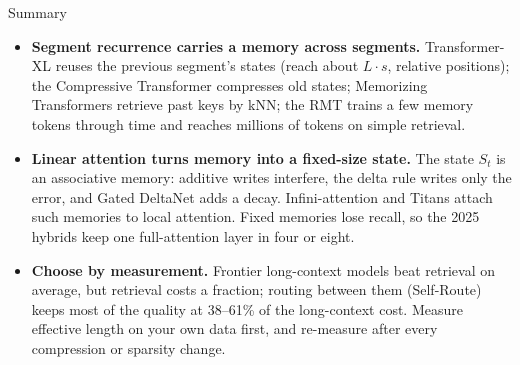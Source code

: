\begin{frame}[allowframebreaks,t]{Summary}
\begin{itemize}
    \item[\textcolor{red}{$\blacktriangleright$}] \textbf{Segment recurrence carries a memory across segments.} Transformer-XL reuses the previous segment's states (reach about $L \cdot s$, relative positions); the Compressive Transformer compresses old states; Memorizing Transformers retrieve past keys by kNN; the RMT trains a few memory tokens through time and reaches millions of tokens on simple retrieval.
    \item[\textcolor{red}{$\blacktriangleright$}] \textbf{Linear attention turns memory into a fixed-size state.} The state $S_t$ is an associative memory: additive writes interfere, the delta rule writes only the error, and Gated DeltaNet adds a decay. Infini-attention and Titans attach such memories to local attention. Fixed memories lose recall, so the 2025 hybrids keep one full-attention layer in four or eight.
    \item[\textcolor{red}{$\blacktriangleright$}] \textbf{Choose by measurement.} Frontier long-context models beat retrieval on average, but retrieval costs a fraction; routing between them (Self-Route) keeps most of the quality at 38--61\% of the long-context cost. Measure effective length on your own data first, and re-measure after every compression or sparsity change.
  \end{itemize}
\end{frame}
